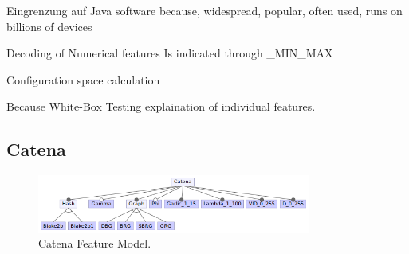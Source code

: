 Eingrenzung auf Java software because, widespread, popular, often used, runs on billions of devices

Decoding of Numerical features Is indicated through \_MIN\_MAX

Configuration space calculation

Because White-Box Testing explaination of individual features.

% 


\subsection{Catena}

\begin{figure}
  \centering
  \includegraphics[width=0.8\textwidth]{images/Catena_Feature_model}
  \caption{Catena Feature Model.}
  \label{fm_catena}
\end{figure}


